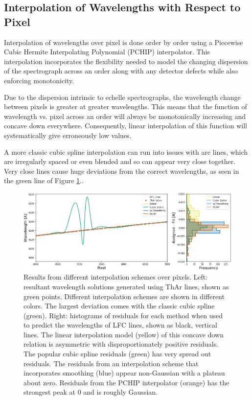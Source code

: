 \documentclass[12pt, letterpaper]{article}
\begin{document}
\subsection{Interpolation of Wavelengths with Respect to Pixel}
Interpolation of wavelengths over pixel  is done order by order using a Piecewise Cubic Hermite Interpolating Polynomial (PCHIP) interpolator.  This interpolation incorporates the flexibility needed to model the changing dispersion of the spectrograph across an order along with any detector defects while also enforcing monotonicity.

Due to the dispersion intrinsic to echelle spectrographs, the wavelength change between pixels is greater at greater wavelengths.  This means that the function of wavelength vs. pixel across an order will always be monotonically increasing and concave down everywhere.  Consequently, linear interpolation of this function will systematically give erroneously low values.

A more classic cubic spline interpolation can run into issues with arc lines, which are irregularly spaced or even blended and so can appear very close together.  Very close lines cause huge deviations from the correct wavelengths, as seen in the green line of Figure \ref{fig:xinterp}..

\begin{figure}[h]
\centering
\includegraphics[width=\textwidth]{Figures/intpx_tests.png}
\caption{Results from different interpolation schemes over pixels.
Left: resultant wavelength solutions generated using ThAr lines, shown as green points.  Different interpolation schemes are shown in different colors.  The largest deviation comes with the classic cubic spline (green).
Right: histograms of residuals for each method when used to predict the wavelengths of LFC lines, shown as black, vertical lines.  The linear interpolation model (yellow) of this concave down relation is asymmetric with disproportionately positive residuals.  The popular cubic spline residuals (green) has very spread out residuals.  The residuals from an interpolation scheme that incorporates smoothing (blue) appear non-Gaussian with a plateau about zero.  Residuals from the PCHIP interpolator (orange) has the strongest peak at 0 and is roughly Gaussian.}
\label{fig:xinterp}
\end{figure} 
\end{document}
